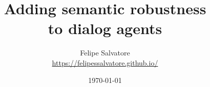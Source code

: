 \title{Adding semantic robustness\\ to dialog agents}
\date{\today}

\vspace{1.1 cm}


\author{
  Felipe Salvatore\\
  \url{https://felipessalvatore.github.io/}
  \vspace{1.1 cm}}


